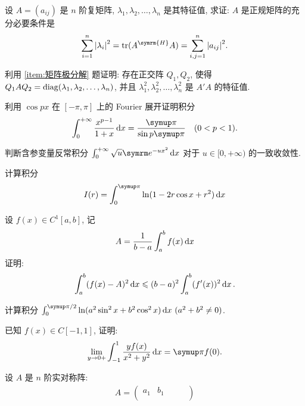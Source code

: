   \begin{exercise}[resume=exer]
      \sitem 设 $ A = (a_{ij}) $ 是 $ n $ 阶复矩阵, $ \lambda_{1}, \lambda_{2}, \dots, \lambda_{n} $ 是其特征值, 求证: $ A $ 是正规矩阵的充分必要条件是
      \begin{align*}
          \sum_{i=1}^{n}\abs{\lambda_{i}}^{2} = \tr(A^{\symrm{H}}A) = \sum_{i, j=1}^{n}\abs{a_{ij}}^{2}.
      \end{align*}
      \item 利用 \ref{item:矩阵极分解} 题证明: 存在正交阵 $ Q_{1}, Q_{2} $, 使得 $ Q_{1} A Q_{2} = \operatorname{diag}(\lambda_{1}, \lambda_{2}, \dots, \lambda_{n}) $, 并且 $ \lambda_{1}^{2}, \lambda_{2}^{2}, \dots, \lambda_{n}^{2} $ 是 $ A'A $ 的特征值.
      \item 利用 $ \cos px $ 在 $ [-\pi, \pi] $ 上的 Fourier 展开证明积分
      \begin{align*}
          \int_{0}^{+\infty} \frac{x^{p-1}}{1+x} \dx* = \frac{\pi}{\sin p\pi}\quad (0<p<1).
      \end{align*}
      \item 判断含参变量反常积分 $ \int_{0}^{+\infty}\sqrt{u}\me^{-ux^{2}} \dx* $ 对于 $ u \in [0, +\infty) $ 的一致收敛性.
      \item 计算积分
      \begin{align*}
          I(r) = \int_{0}^{\pi} \ln(1 - 2r\cos x + r^{2}) \dx*
      \end{align*}
      \item 设 $ f(x)\in C^{1}[a, b] $, 记
      \begin{align*}
          A = \frac{1}{b - a}\int_{a}^{b} f(x) \dx*
      \end{align*}
      证明:
      \begin{align*}
          \int_{a}^{b}(f(x) - A)^{2} \dx* \le (b-a)^{2} \int_{a}^{b} (f'(x))^{2} \dx*.
      \end{align*}
      \item 计算积分 $ \int_{0}^{\pi/2} \ln(a^{2}\sin^{2}x + b^{2}\cos^{2} x)\dx*\,(a^{2} + b^{2} \ne 0) $.
      \item 已知 $ f(x) \in C[-1, 1] $, 证明:
      \begin{align*}
          \limit{y}{0+} \int_{-1}^{1}\frac{yf(x)}{x^{2} + y^{2}} \dx* = \pi f(0).
      \end{align*}
      \item 设 $ A $ 是 $ n $ 阶实对称阵:
      \begin{align*}
          A = \begin{pmatrix}
              a_{1} & b_{1} & & & \\

\end{pmatrix}
\end{align*}
\end{exercise}
